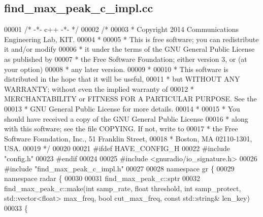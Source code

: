 \subsection{find\+\_\+max\+\_\+peak\+\_\+c\+\_\+impl.\+cc}
\label{find__max__peak__c__impl_8cc_source}

\begin{DoxyCode}
00001 \textcolor{comment}{/* -*- c++ -*- */}
00002 \textcolor{comment}{/* }
00003 \textcolor{comment}{ * Copyright 2014 Communications Engineering Lab, KIT.}
00004 \textcolor{comment}{ * }
00005 \textcolor{comment}{ * This is free software; you can redistribute it and/or modify}
00006 \textcolor{comment}{ * it under the terms of the GNU General Public License as published by}
00007 \textcolor{comment}{ * the Free Software Foundation; either version 3, or (at your option)}
00008 \textcolor{comment}{ * any later version.}
00009 \textcolor{comment}{ * }
00010 \textcolor{comment}{ * This software is distributed in the hope that it will be useful,}
00011 \textcolor{comment}{ * but WITHOUT ANY WARRANTY; without even the implied warranty of}
00012 \textcolor{comment}{ * MERCHANTABILITY or FITNESS FOR A PARTICULAR PURPOSE.  See the}
00013 \textcolor{comment}{ * GNU General Public License for more details.}
00014 \textcolor{comment}{ * }
00015 \textcolor{comment}{ * You should have received a copy of the GNU General Public License}
00016 \textcolor{comment}{ * along with this software; see the file COPYING.  If not, write to}
00017 \textcolor{comment}{ * the Free Software Foundation, Inc., 51 Franklin Street,}
00018 \textcolor{comment}{ * Boston, MA 02110-1301, USA.}
00019 \textcolor{comment}{ */}
00020 
00021 \textcolor{preprocessor}{#ifdef HAVE\_CONFIG\_H}
00022 \textcolor{preprocessor}{#include "config.h"}
00023 \textcolor{preprocessor}{#endif}
00024 
00025 \textcolor{preprocessor}{#include <gnuradio/io\_signature.h>}
00026 \textcolor{preprocessor}{#include "find_max_peak_c_impl.h"}
00027 
00028 \textcolor{keyword}{namespace }gr \{
00029   \textcolor{keyword}{namespace }radar \{
00030 
00031     find_max_peak_c::sptr
00032     find_max_peak_c::make(\textcolor{keywordtype}{int} samp_rate, \textcolor{keywordtype}{float} threshold, \textcolor{keywordtype}{int} samp\_protect, std::vector<float> max\_freq, \textcolor{keywordtype}{
      bool} cut\_max\_freq, \textcolor{keyword}{const} std::string& len\_key)
00033     \{

\end{DoxyCode}
